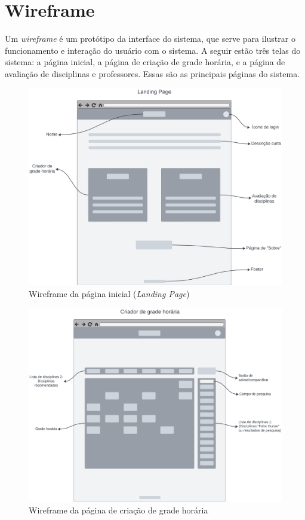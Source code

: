 \chapter{Wireframe}
\label{cha:Wireframe}

Um \textit{wireframe} é um protótipo da interface do sistema, que serve para ilustrar o funcionamento e interação do usuário com o sistema. A seguir estão três telas do sistema: a página inicial, a página de criação de grade horária, e a página de avaliação de disciplinas e professores. Essas são as principais páginas do sistema.

\begin{figure}[ht]
    \begin{center}
    \includegraphics[width=390pt]{figuras/pagina-inicial.png}
    \caption{Wireframe da página inicial (\textit{Landing Page})}
    \label{fig:wireframe-pagina-inicial}
    \end{center}
\end{figure}

\begin{figure}[ht]
    \begin{center}
    \includegraphics[width=390pt]{figuras/pagina-criacao.png}
    \caption{Wireframe da página de criação de grade horária}
    \label{fig:wireframe-pagina-criacao}
    \end{center}
\end{figure}

